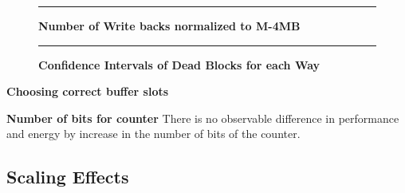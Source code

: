 \begin{figure*} [t]
\centering
 \hrule
 \caption{\label{fig:writebacks} \scriptsize \bf Number of Write backs normalized to M-4MB}
\end{figure*}


\begin{figure*} [t]
\centering
 \hrule
 \caption{\label{fig:confi} \scriptsize \bf Confidence Intervals of Dead Blocks for each Way}
\end{figure*}

\noindent\textbf {Choosing correct buffer slots}

\noindent\textbf {Number of bits for counter}
There is no observable difference in performance and energy by increase in the number of bits of the counter. 
\subsection{Scaling Effects}







